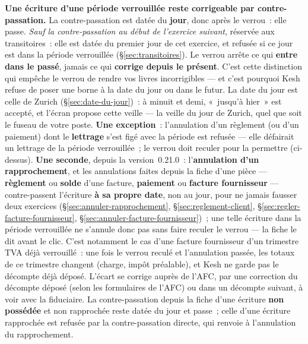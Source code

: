 \documentclass[a4paper,11pt,oneside]{article}
\begin{document}
\begin{keshwarning}[title={\faExclamationTriangle\ Ce que le verrou n'empêche pas, et c'est voulu}]
\textbf{Une écriture d'une période verrouillée reste corrigeable par contre-passation.} La
contre-passation est datée du \textbf{jour}, donc après le verrou~: elle passe. \emph{Sauf la
contre-passation au début de l'exercice suivant}, réservée aux transitoires~: elle est datée du
premier jour de cet exercice, et refusée si ce jour est dans la période verrouillée
(\S\ref{sec:transitoires}). Le verrou arrête
ce qui \textbf{entre dans le passé}, jamais ce qui \textbf{corrige depuis le présent}. C'est
cette distinction qui empêche le verrou de rendre vos livres incorrigibles --- et c'est pourquoi
Kesh refuse de poser une borne à la date du jour ou dans le futur. La date du jour est celle de
Zurich (\S\ref{sec:date-du-jour})~: à minuit et demi, «~jusqu'à hier~» est accepté, et l'écran
propose cette veille --- la veille du jour de Zurich, quel que soit le fuseau de votre poste.
\textbf{Une exception}~: l'annulation d'un règlement (ou d'un paiement) dont le
\textbf{lettrage} s'est figé avec la période est refusée --- elle défairait un lettrage de la
période verrouillée~; le verrou doit reculer pour la permettre (ci-dessus).
\textbf{Une seconde}, depuis la version~0.21.0~: l'\textbf{annulation d'un rapprochement}, et les
annulations faites depuis la fiche d'une pièce --- \textbf{règlement} ou \textbf{solde} d'une
facture, \textbf{paiement} ou \textbf{facture fournisseur} --- contre-passent l'écriture \textbf{à
sa propre date}, non au jour, pour ne jamais fausser deux exercices
(\S\ref{sec:annuler-rapprochement}, \S\ref{sec:reglement-client},
\S\ref{sec:regler-facture-fournisseur}, \S\ref{sec:annuler-facture-fournisseur})~; une telle écriture dans la période
verrouillée ne s'annule donc pas sans faire reculer le verrou --- la fiche le dit avant le clic.
C'est notamment le cas d'une facture fournisseur d'un trimestre TVA déjà verrouillé~: une fois le
verrou reculé et l'annulation passée, les totaux de ce trimestre changent (charge, impôt
préalable), et Kesh ne garde pas le décompte déjà déposé. L'écart se corrige auprès de l'AFC, par
une correction du décompte déposé (selon les formulaires de l'AFC) ou dans un décompte suivant, à voir avec la fiduciaire. La
contre-passation depuis la fiche d'une écriture \textbf{non possédée} et non rapprochée reste
datée du jour et passe~; celle d'une écriture rapprochée est refusée par la contre-passation
directe, qui renvoie à l'annulation du rapprochement.
\end{keshwarning}
\end{document}
